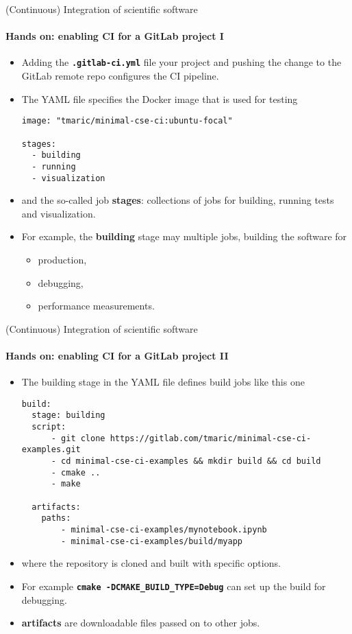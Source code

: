 \begin{frame}[fragile]{(Continuous) Integration of scientific software} 
    \framesubtitle{Hands on: enabling CI for a GitLab project I} 
    \vfill

    \begin{itemize}
        \item Adding the \textbf{\texttt{.gitlab-ci.yml}} file your project and pushing the change to the GitLab remote repo configures the CI pipeline.
        \item The YAML file specifies the Docker image that is used for testing 
            \begin{verbatim}
image: "tmaric/minimal-cse-ci:ubuntu-focal"

stages:
  - building
  - running
  - visualization
            \end{verbatim}
        \item and the so-called job \textbf{stages}: collections of jobs for building, running tests and visualization. 
        \item For example, the \textbf{building} stage may multiple jobs, building the software for 
            \begin{itemize}
                \item production,
                \item debugging,
                \item performance measurements.
            \end{itemize}
    \end{itemize}

\end{frame}

\begin{frame}[fragile]{(Continuous) Integration of scientific software} 
    \framesubtitle{Hands on: enabling CI for a GitLab project II} 
    \vfill

    \begin{itemize}
        \item The building stage in the YAML file defines build jobs like this one
            \begin{verbatim}
build:
  stage: building
  script:
      - git clone https://gitlab.com/tmaric/minimal-cse-ci-examples.git
      - cd minimal-cse-ci-examples && mkdir build && cd build 
      - cmake .. 
      - make

  artifacts:
    paths:
        - minimal-cse-ci-examples/mynotebook.ipynb
        - minimal-cse-ci-examples/build/myapp

            \end{verbatim}
        \item where the repository is cloned and built with specific options.  
        \item For example \textbf{\texttt{cmake -DCMAKE\_BUILD\_TYPE=Debug}} can set up the build for debugging. 
        \item \textbf{artifacts} are downloadable files passed on to other jobs.
    \end{itemize}

\end{frame}

